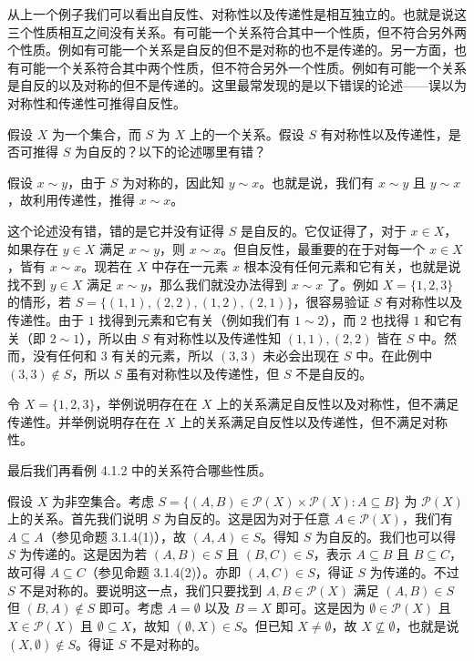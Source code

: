 从上一个例子我们可以看出自反性、对称性以及传递性是相互独立的。也就是说这三个性质相互之间没有关系。有可能一个关系符合其中一个性质，但不符合另外两个性质。例如有可能一个关系是自反的但不是对称的也不是传递的。另一方面，也有可能一个关系符合其中两个性质，但不符合另外一个性质。例如有可能一个关系是自反的以及对称的但不是传递的。这里最常发现的是以下错误的论述——误以为对称性和传递性可推得自反性。

\begin{example}
假设 $X$ 为一个集合，而 $S$ 为 $X$ 上的一个关系。假设 $S$ 有对称性以及传递性，是否可推得 $S$ 为自反的？以下的论述哪里有错？

假设 $x \sim y$，由于 $S$ 为对称的，因此知 $y \sim x$。也就是说，我们有 $x \sim y$ 且 $y \sim x$，故利用传递性，推得 $x \sim x$。
\end{example}

这个论述没有错，错的是它并没有证得 $S$ 是自反的。它仅证得了，对于 $x \in X$，如果存在 $y \in X$ 满足 $x \sim y$，则 $x \sim x$。但自反性，最重要的在于对每一个 $x \in X$，皆有 $x \sim x$。现若在 $X$ 中存在一元素 $x$ 根本没有任何元素和它有关，也就是说找不到 $y \in X$ 满足 $x \sim y$，那么我们就没办法得到 $x \sim x$ 了。例如 $X = \{1, 2, 3\}$ 的情形，若 $S = \{(1, 1), (2, 2), (1, 2), (2, 1)\}$，很容易验证 $S$ 有对称性以及传递性。由于 $1$ 找得到元素和它有关（例如我们有 $1 \sim 2$），而 $2$ 也找得 $1$ 和它有关（即 $2 \sim 1$），所以由 $S$ 有对称性以及传递性知 $(1, 1), (2, 2)$ 皆在 $S$ 中。然而，没有任何和 $3$ 有关的元素，所以 $(3, 3)$ 未必会出现在 $S$ 中。在此例中 $(3, 3) \notin S$，所以 $S$ 虽有对称性以及传递性，但 $S$ 不是自反的。

\begin{question}
令 $X = \{1, 2, 3\}$，举例说明存在在 $X$ 上的关系满足自反性以及对称性，但不满足传递性。并举例说明存在在 $X$ 上的关系满足自反性以及传递性，但不满足对称性。
\end{question}

最后我们再看例 4.1.2 中的关系符合哪些性质。

\begin{example}
假设 $X$ 为非空集合。考虑 $S = \{(A, B) \in \mathcal{P}(X) \times \mathcal{P}(X) : A \subseteq B\}$ 为 $\mathcal{P}(X)$ 上的关系。首先我们说明 $S$ 为自反的。这是因为对于任意 $A \in \mathcal{P}(X)$，我们有 $A \subseteq A$（参见命题 3.1.4(1)），故 $(A, A) \in S$。得知 $S$ 为自反的。我们也可以得 $S$ 为传递的。这是因为若 $(A, B) \in S$ 且 $(B, C) \in S$，表示 $A \subseteq B$ 且 $B \subseteq C$，故可得 $A \subseteq C$（参见命题 3.1.4(2)）。亦即 $(A, C) \in S$，得证 $S$ 为传递的。不过 $S$ 不是对称的。要说明这一点，我们只要找到 $A, B \in \mathcal{P}(X)$ 满足 $(A, B) \in S$ 但 $(B, A) \notin S$ 即可。考虑 $A = \emptyset$ 以及 $B = X$ 即可。这是因为 $\emptyset \in \mathcal{P}(X)$ 且 $X \in \mathcal{P}(X)$ 且 $\emptyset \subseteq X$，故知 $(\emptyset, X) \in S$。但已知 $X \neq \emptyset$，故 $X \nsubseteq \emptyset$，也就是说 $(X, \emptyset) \notin S$。得证 $S$ 不是对称的。
\end{example}


